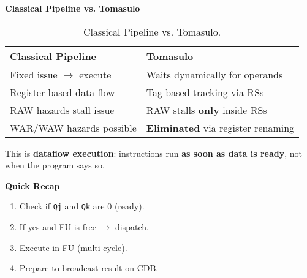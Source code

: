 \begin{flushleft}
    \textcolor{Green3}{ \textbf{Classical Pipeline vs. Tomasulo}}
\end{flushleft}
\begin{table}[!htp]
    \centering
    \begin{tabular}{@{} l | l @{}}
        \toprule
        Classical Pipeline & Tomasulo \\
        \midrule
        Fixed issue $\rightarrow$ execute & Waits dynamically for operands \\ [.3em]
        Register-based data flow & Tag-based tracking via RSs \\ [.3em]
        RAW hazards stall issue & RAW stalls \textbf{only} inside RSs \\ [.3em]
        WAR/WAW hazards possible & \textbf{Eliminated} via register renaming \\
        \bottomrule
    \end{tabular}
    \caption{Classical Pipeline vs. Tomasulo.}
\end{table}

\noindent
This is \textbf{dataflow execution}: instructions run \textbf{as soon as data is ready}, not when the program says so.

\highspace
\begin{flushleft}
    \textcolor{Green3}{ \textbf{Quick Recap}}
\end{flushleft}
\begin{enumerate}
    \item Check if \texttt{Qj} and \texttt{Qk} are 0 (ready).
    \item If yes and FU is free $\rightarrow$ dispatch.
    \item Execute in FU (multi-cycle).
    \item Prepare to broadcast result on CDB.
\end{enumerate}
